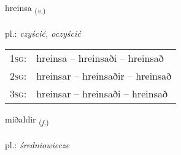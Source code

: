 \documentclass[frontgrid, backgrid]{flacards}\usepackage[]{graphicx}\usepackage[]{xcolor}
\begin{document}
\renewcommand{\flhead}{\vskip5pt \fboxsep=0pt {\small\bfseries\footnotesize Sagnorð | czasownik}}
\renewcommand{\fcfoot}{\vskip5pt \fboxsep=0pt \hspace{2pt}{\small\bfseries\footnotesize 3K}}

\renewcommand{\blhead}{\vskip5pt {\small\bfseries\footnotesize Sagnorð | czasownik }}
\renewcommand{\bcfoot}{\vskip5pt \hspace{2pt}{\small\bfseries\footnotesize 3K}}


{hreinsa \small{\textsubscript{(\textit{v.})}} \\[1ex] %
\textphonetic{[r̥einsa]} \\
pl.: \emph{czyścić, oczyścić} \\  [2ex]
\renewcommand*{\arraystretch}{0.8}
\begin{tabular}{p{1cm}l}
\textsc{1sg}: & hreinsa -- hreinsaði -- hreinsað \\ 
\textsc{2sg}: & hreinsar -- hreinsaðir -- hreinsað \\ 
\textsc{3sg}: & hreinsar -- hreinsaði -- hreinsað \\ 
\end{tabular}
}

\renewcommand{\flhead}{\vskip5pt \fboxsep=0pt {\small\bfseries\footnotesize Nafnorð | rzeczownik}}
\renewcommand{\fcfoot}{\vskip5pt \fboxsep=0pt \hspace{2pt}{\small\bfseries\footnotesize 3K}}

\renewcommand{\blhead}{\vskip5pt {\small\bfseries\footnotesize Nafnorð | rzeczownik }}
\renewcommand{\bcfoot}{\vskip5pt \hspace{2pt}{\small\bfseries\footnotesize 3K}}


{miðaldir \small{\textsubscript{(\textit{f.})}} \\[1ex] %
\textphonetic{[mɪːðaltɪr]} \\
pl.: \emph{średniowiecze} \\  [2ex]
\renewcommand*{\arraystretch}{0.8}
}
\end{document}
